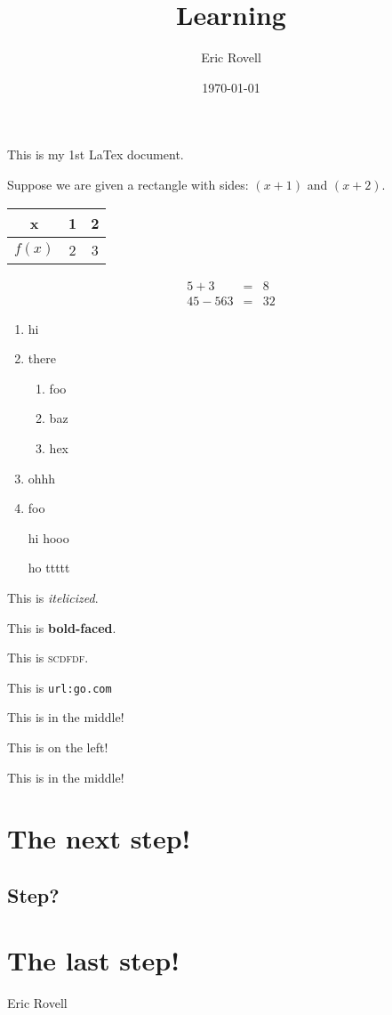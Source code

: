 \documentclass[12pt]{article}
\def\name{Eric Rovell}
\begin{document}
\title{Learning}
\author{Eric Rovell}
\date{\today}
\maketitle

\tableofcontents

  This is my 1st LaTex document.
  
  Suppose we are given a rectangle with sides: $(x + 1)$ and $(x + 2)$.

  \begin{tabular}{c|c|c}
    x & 1 & 2 \\ \hline
    $f(x)$ & 2 & 3
  \end{tabular}

  \begin{eqnarray*}
    5 + 3 &=& 8 \\
    45 - 563 &=& 32
  \end{eqnarray*}

  \begin{enumerate}
    \item hi
    \item there
      \begin{enumerate}
        \item foo
        \item baz
        \item hex
      \end{enumerate}
    \item ohhh\item foo
  \end{enumerate}

  \begin{itemize}
    \item[hi] hooo
    \item[ho] ttttt    
  \end{itemize}

  This is \textit{itelicized}.

  This is \textbf{bold-faced}.

  This is \textsc{scdfdf}.

  This is \texttt{url:go.com}

\begin{center} This is in the middle! \end{center}

\begin{flushleft} This is on the left! \end{flushleft}

\begin{flushright} This is in the middle! \end{flushright}
  
\section{The next step!}
  \subsection{Step?}
\section{The last step!}

\name
\end{document}
